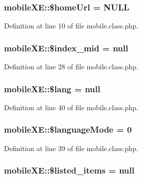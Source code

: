 \hypertarget{classmobileXE_abff078bb36c02394447e55be4500b762}{
\subsubsection[{\$home\-Url}]{\setlength{\rightskip}{0pt plus 5cm}mobile\-X\-E\-::\$home\-Url = N\-U\-L\-L}}\label{classmobileXE_abff078bb36c02394447e55be4500b762}


Definition at line 10 of file mobile.\-class.\-php.

\hypertarget{classmobileXE_a9e93ed38eed50085338e8128ab4015ab}{
\subsubsection[{\$index\-\_\-mid}]{\setlength{\rightskip}{0pt plus 5cm}mobile\-X\-E\-::\$index\-\_\-mid = null}}\label{classmobileXE_a9e93ed38eed50085338e8128ab4015ab}


Definition at line 28 of file mobile.\-class.\-php.

\hypertarget{classmobileXE_a126d781fe75edb57ef2718f5a6e26d82}{
\subsubsection[{\$lang}]{\setlength{\rightskip}{0pt plus 5cm}mobile\-X\-E\-::\$lang = null}}\label{classmobileXE_a126d781fe75edb57ef2718f5a6e26d82}


Definition at line 40 of file mobile.\-class.\-php.

\hypertarget{classmobileXE_a70ee01279ea1bcdd609905e80e4544b7}{
\subsubsection[{\$language\-Mode}]{\setlength{\rightskip}{0pt plus 5cm}mobile\-X\-E\-::\$language\-Mode = 0}}\label{classmobileXE_a70ee01279ea1bcdd609905e80e4544b7}


Definition at line 39 of file mobile.\-class.\-php.

\hypertarget{classmobileXE_abd07e5909154b43a31e2ebff5d51e4c7}{
\subsubsection[{\$listed\-\_\-items}]{\setlength{\rightskip}{0pt plus 5cm}mobile\-X\-E\-::\$listed\-\_\-items = null}}\label{classmobileXE_abd07e5909154b43a31e2ebff5d51e4c7}


